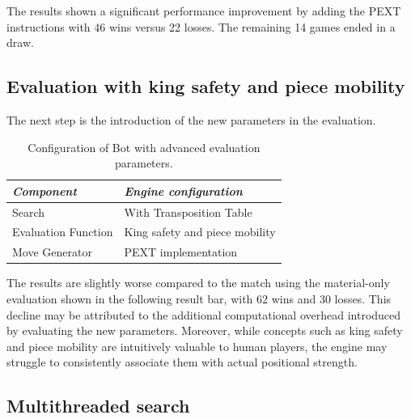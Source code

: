 \begin{center}
\medskip
\end{center}

\noindent The results shown a significant performance improvement by adding the PEXT instructions with 46 wins versus 22 losses. The remaining 14 games ended in a draw.

\subsection*{Evaluation with king safety and piece mobility}

\noindent The next step is the introduction of the new parameters in the evaluation.
\vspace{1em}

\begin{table}[H]
    \centering
    \begin{tabular}{|p{4cm}|p{6cm}|}
    \hline
    \textit{Component}         & \textit{Engine configuration}    \\ \hline
    Search                     & With Transposition Table   \\ \hline
    Evaluation Function        & King safety and piece mobility     \\ \hline
    Move Generator             & PEXT implementation                \\ \hline
    \end{tabular}
    \caption*{Configuration of Bot with advanced evaluation parameters.}\label{tab:advancedEval_vs_basic}
\end{table}

\begin{center}
\medskip
\end{center}

\noindent The results are slightly worse compared to the match using the material-only evaluation shown in the following result bar, with 62 wins and 30 losses. This decline may be attributed to the additional computational overhead introduced by evaluating the new parameters. Moreover, while concepts such as king safety and piece mobility are intuitively valuable to human players, the engine may struggle to consistently associate them with actual positional strength.

\subsection*{Multithreaded search}

